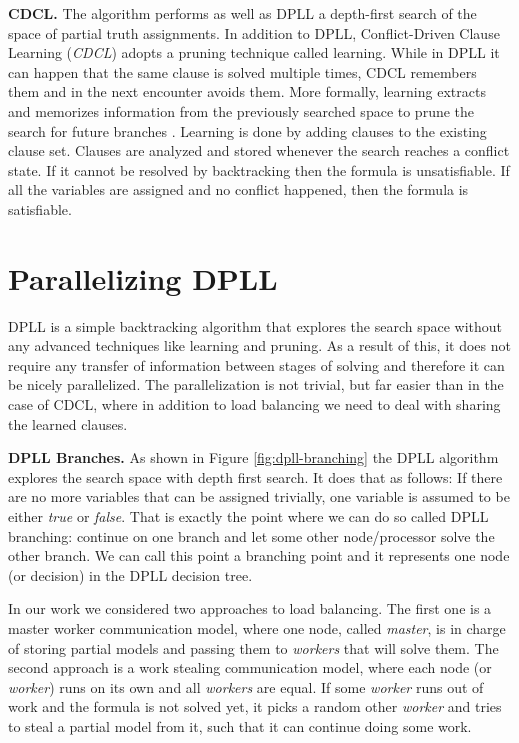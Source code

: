 \documentclass[letterpaper]{article}
\newcommand{\mypar}[1]{{\bf #1.}}
\begin{document}
\mypar{CDCL}
The algorithm performs as well as DPLL a depth-first search of the space of partial truth assignments.
In addition to DPLL, Conflict-Driven Clause Learning (\textit{CDCL}) adopts a pruning technique called learning.
While in DPLL it can happen that the same clause is solved multiple times, CDCL remembers them and in the next encounter avoids them.
More formally, learning extracts and memorizes information from the previously searched space to prune the search for future branches \cite{cdcl}.
Learning is done by adding clauses to the existing clause set.
Clauses are analyzed and stored whenever the search reaches a conflict state.
If it cannot be resolved by backtracking then the formula is unsatisfiable.
If all the variables are assigned and no conflict happened, then the formula is satisfiable.

\section{Parallelizing DPLL}\label{sec:parallel_dpll}

DPLL is a simple backtracking algorithm that explores the search space without any advanced techniques like learning and pruning.
As a result of this, it does not require any transfer of information between stages of solving and therefore it can be nicely parallelized.
The parallelization is not trivial, but far easier than in the case of CDCL, where in addition to load balancing we need to deal with sharing the learned clauses.


\mypar{DPLL Branches}
As shown in Figure \ref{fig:dpll-branching} the DPLL algorithm explores the search space with depth first search.
It does that as follows: If there are no more variables that can be assigned trivially, one variable is assumed to be either \textit{true} or \textit{false}.
That is exactly the point where we can do so called DPLL branching: continue on one branch and let some other node/processor solve the other branch.
We can call this point a branching point and it represents one node (or decision) in the DPLL decision tree.

In our work we considered two approaches to load balancing.
The first one is a master worker communication model, where one node, called \textit{master}, is in charge of storing partial models and passing them to \textit{workers} that will solve them.
The second approach is a work stealing communication model, where each node (or \textit{worker}) runs on its own and all \textit{workers} are equal.
If some \textit{worker} runs out of work and the formula is not solved yet, it picks a random other \textit{worker} and tries to steal a partial model from it, such that it can continue doing some work.
\end{document}
